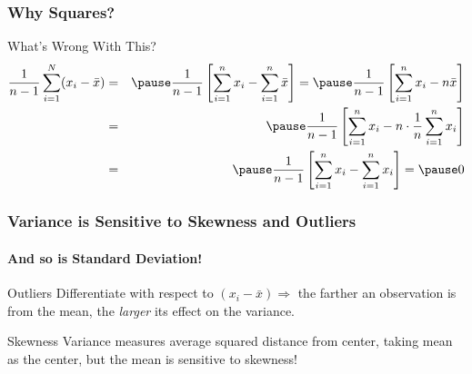\documentclass[handout]{beamer}
\begin{document}
\begin{frame}
\frametitle{Why Squares?}
\begin{center}\end{center}
\begin{alertblock}{What's Wrong With This?}
	\begin{eqnarray*}
		\displaystyle\frac{1}{n-1}\sum_{i=1}^N (x_i - \bar{x}) &=& \pause\frac{1}{n-1}\left[\sum_{i=1}^n x_i - \sum_{i=1}^n \bar{x} \right] = \pause\frac{1}{n-1}\left[ \sum_{i=1}^n x_i  - n\bar{x}\right]\\
			&=& \pause \frac{1}{n-1}\left[ \sum_{i=1}^n x_i  - n\cdot\frac{1}{n} \sum_{i=1}^n x_i\right]\\ &=& \pause \frac{1}{n-1}\left[ \sum_{i=1}^n x_i  -  \sum_{i=1}^n x_i\right] =\pause 0
	\end{eqnarray*}
\end{alertblock}

\end{frame}

\begin{frame}
\frametitle{Variance is Sensitive to Skewness and Outliers}
\framesubtitle{And so is Standard Deviation!}
\begin{center}\end{center}


\begin{block}{Outliers}
Differentiate with respect to $(x_i-\bar{x})\Rightarrow$ the farther an observation is from the mean, the \emph{larger} its effect on the variance.
\end{block}


\begin{block}{Skewness}
Variance measures average squared distance from center, taking \alert{mean} as the center, but the mean is sensitive to skewness!
\end{block}

\end{frame}
\end{document}

